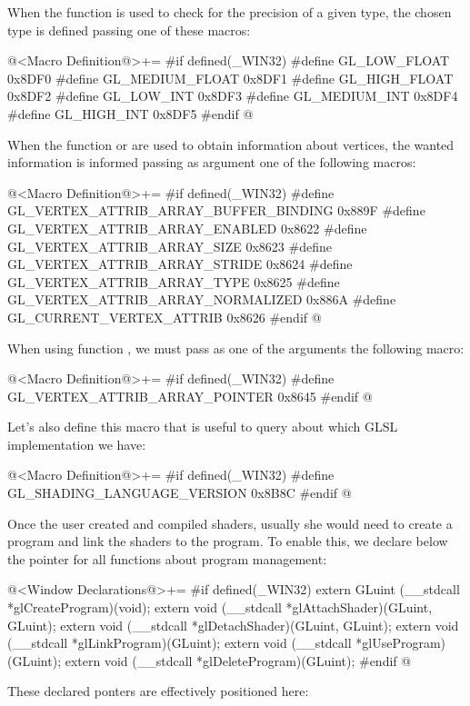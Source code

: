 When the function  is used to
check for the precision of a given type, the chosen type is defined
passing one of these macros:

\iniciocodigo
@<Macro Definition@>+=
#if defined(_WIN32)
#define GL_LOW_FLOAT    0x8DF0
#define GL_MEDIUM_FLOAT 0x8DF1
#define GL_HIGH_FLOAT   0x8DF2
#define GL_LOW_INT      0x8DF3
#define GL_MEDIUM_INT   0x8DF4
#define GL_HIGH_INT     0x8DF5
#endif
@
\fimcodigo

When the function 
or  are used to obtain information
about vertices, the wanted information is informed passing as argument
one of the following macros:

\iniciocodigo
@<Macro Definition@>+=
#if defined(_WIN32)
#define GL_VERTEX_ATTRIB_ARRAY_BUFFER_BINDING 0x889F
#define GL_VERTEX_ATTRIB_ARRAY_ENABLED        0x8622
#define GL_VERTEX_ATTRIB_ARRAY_SIZE           0x8623
#define GL_VERTEX_ATTRIB_ARRAY_STRIDE         0x8624
#define GL_VERTEX_ATTRIB_ARRAY_TYPE           0x8625
#define GL_VERTEX_ATTRIB_ARRAY_NORMALIZED     0x886A
#define GL_CURRENT_VERTEX_ATTRIB              0x8626
#endif
@
\fimcodigo

When using function , we must
pass as one of the arguments the following macro:

\iniciocodigo
@<Macro Definition@>+=
#if defined(_WIN32)
#define GL_VERTEX_ATTRIB_ARRAY_POINTER 0x8645
#endif
@
\fimcodigo

Let's also define this macro that is useful to query about which GLSL
implementation we have:

\iniciocodigo
@<Macro Definition@>+=
#if defined(_WIN32)
#define GL_SHADING_LANGUAGE_VERSION 0x8B8C
#endif
@
\fimcodigo

Once the user created and compiled shaders, usually she would need to
create a program and link the shaders to the program. To enable this,
we declare below the pointer for all functions about program
management:

\iniciocodigo
@<Window Declarations@>+=
#if defined(_WIN32)
extern GLuint (__stdcall *glCreateProgram)(void);
extern void (__stdcall *glAttachShader)(GLuint, GLuint);
extern void (__stdcall *glDetachShader)(GLuint, GLuint);
extern void (__stdcall *glLinkProgram)(GLuint);
extern void (__stdcall *glUseProgram)(GLuint);
extern void (__stdcall *glDeleteProgram)(GLuint);
#endif
@
\fimcodigo

These declared ponters are effectively positioned here:

